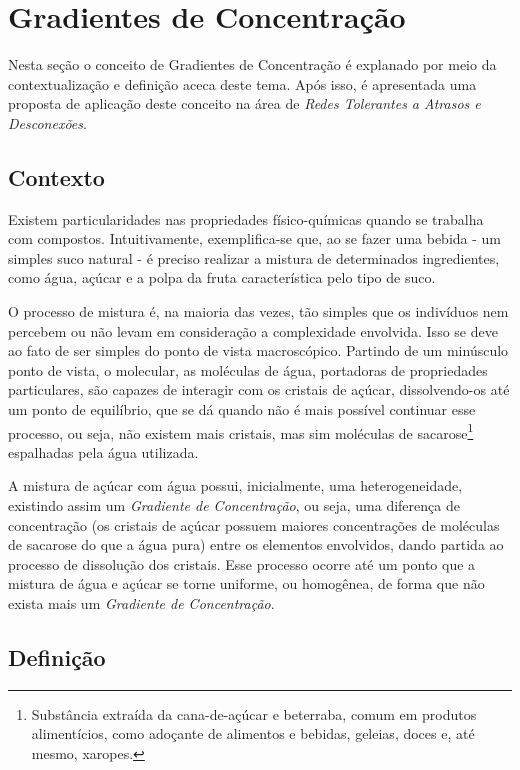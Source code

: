 \newpage
\section{Gradientes de Concentração}
\label{sec:gradientes_de_concentracao}

Nesta seção o conceito de Gradientes de Concentração é explanado por meio da contextualização e definição aceca deste tema. Após isso, é apresentada uma proposta de aplicação deste conceito na área de \emph{Redes Tolerantes a Atrasos e Desconexões}.

\subsection{Contexto}

Existem particularidades nas propriedades físico-químicas quando se trabalha com compostos. Intuitivamente, exemplifica-se que, ao se fazer uma bebida - um simples suco natural - é preciso realizar a mistura de determinados ingredientes, como água, açúcar e a polpa da fruta característica pelo tipo de suco.

O processo de mistura é, na maioria das vezes, tão simples que os indivíduos nem percebem ou não levam em consideração a complexidade envolvida. Isso se deve ao fato de ser simples do ponto de vista macroscópico. Partindo de um minúsculo ponto de vista, o molecular, as moléculas de água, portadoras de propriedades particulares, são capazes de interagir com os cristais de açúcar, dissolvendo-os até um ponto de equilíbrio, que se dá quando não é mais possível continuar esse processo, ou seja, não existem mais cristais, mas sim moléculas de sacarose\footnote{Substância extraída da cana-de-açúcar e beterraba, comum em produtos alimentícios, como adoçante de alimentos e bebidas, geleias, doces e, até mesmo, xaropes.} espalhadas pela água utilizada. 

A mistura de açúcar com água possui, inicialmente, uma heterogeneidade, existindo assim um \emph{Gradiente de Concentração}, ou seja, uma diferença de concentração (os cristais de açúcar possuem maiores concentrações de moléculas de sacarose do que a água pura) entre os elementos envolvidos, dando partida ao processo de dissolução dos cristais. Esse processo ocorre até um ponto que a mistura de água e açúcar se torne uniforme, ou homogênea, de forma que não exista mais um \emph{Gradiente de Concentração}.

\subsection{Definição}

